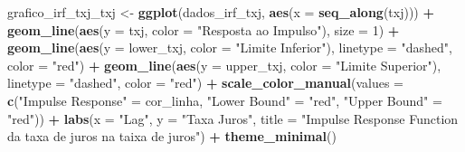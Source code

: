 \documentclass[
]{article}
\newenvironment{Shaded}{\begin{snugshade}}{\end{snugshade}}
\newcommand{\AttributeTok}[1]{\textcolor[rgb]{0.13,0.29,0.53}{#1}}
\newcommand{\DecValTok}[1]{\textcolor[rgb]{0.00,0.00,0.81}{#1}}
\newcommand{\FunctionTok}[1]{\textcolor[rgb]{0.13,0.29,0.53}{\textbf{#1}}}
\newcommand{\NormalTok}[1]{#1}
\newcommand{\OtherTok}[1]{\textcolor[rgb]{0.56,0.35,0.01}{#1}}
\newcommand{\SpecialCharTok}[1]{\textcolor[rgb]{0.81,0.36,0.00}{\textbf{#1}}}
\newcommand{\StringTok}[1]{\textcolor[rgb]{0.31,0.60,0.02}{#1}}
\begin{document}
\begin{Shaded}
\begin{Highlighting}[]
\NormalTok{grafico\_irf\_txj\_txj }\OtherTok{\textless{}{-}} \FunctionTok{ggplot}\NormalTok{(dados\_irf\_txj, }\FunctionTok{aes}\NormalTok{(}\AttributeTok{x =} \FunctionTok{seq\_along}\NormalTok{(txj))) }\SpecialCharTok{+}
  \FunctionTok{geom\_line}\NormalTok{(}\FunctionTok{aes}\NormalTok{(}\AttributeTok{y =}\NormalTok{ txj, }\AttributeTok{color =} \StringTok{"Resposta ao Impulso"}\NormalTok{), }\AttributeTok{size =} \DecValTok{1}\NormalTok{) }\SpecialCharTok{+}
  \FunctionTok{geom\_line}\NormalTok{(}\FunctionTok{aes}\NormalTok{(}\AttributeTok{y =}\NormalTok{ lower\_txj, }\AttributeTok{color =} \StringTok{"Limite Inferior"}\NormalTok{), }\AttributeTok{linetype =} \StringTok{"dashed"}\NormalTok{, }\AttributeTok{color =} \StringTok{"red"}\NormalTok{) }\SpecialCharTok{+}
  \FunctionTok{geom\_line}\NormalTok{(}\FunctionTok{aes}\NormalTok{(}\AttributeTok{y =}\NormalTok{ upper\_txj, }\AttributeTok{color =} \StringTok{"Limite Superior"}\NormalTok{), }\AttributeTok{linetype =} \StringTok{"dashed"}\NormalTok{, }\AttributeTok{color =} \StringTok{"red"}\NormalTok{) }\SpecialCharTok{+}
  \FunctionTok{scale\_color\_manual}\NormalTok{(}\AttributeTok{values =} \FunctionTok{c}\NormalTok{(}\StringTok{"Impulse Response"} \OtherTok{=}\NormalTok{ cor\_linha, }\StringTok{"Lower Bound"} \OtherTok{=} \StringTok{"red"}\NormalTok{, }\StringTok{"Upper Bound"} \OtherTok{=} \StringTok{"red"}\NormalTok{)) }\SpecialCharTok{+}
  \FunctionTok{labs}\NormalTok{(}\AttributeTok{x =} \StringTok{"Lag"}\NormalTok{, }\AttributeTok{y =} \StringTok{"Taxa Juros"}\NormalTok{, }\AttributeTok{title =} \StringTok{"Impulse Response Function da taxa de juros na taixa de juros"}\NormalTok{) }\SpecialCharTok{+}
  \FunctionTok{theme\_minimal}\NormalTok{()}



\end{Highlighting}
\end{Shaded}
\end{document}
